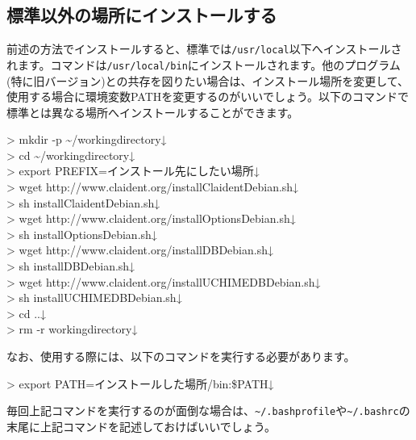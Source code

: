 \documentclass[titlepage,10pt,a4paper]{jsbook}
\newenvironment{cmd}{\begin{oframed}\raggedright\ttfamily\footnotesize\setlength{\baselineskip}{1.4em}}{\end{oframed}\vspace{-1em}}
\begin{document}
\subsection{標準以外の場所にインストールする}

前述の方法でインストールすると、標準では\texttt{/usr/local}以下へインストールされます。コマンドは\texttt{/usr/local/bin}にインストールされます。他のプログラム(特に旧バージョン)との共存を図りたい場合は、インストール場所を変更して、使用する場合に環境変数PATHを変更するのがいいでしょう。以下のコマンドで標準とは異なる場所へインストールすることができます。

\begin{cmd}
{\textgreater} mkdir -p {\textasciitilde}/workingdirectory↓\\
{\textgreater} cd {\textasciitilde}/workingdirectory↓\\
{\textgreater} export PREFIX=インストール先にしたい場所↓\\
{\textgreater} wget http://www.claident.org/installClaident{\textunderscore}Debian.sh↓\\
{\textgreater} sh installClaident{\textunderscore}Debian.sh↓\\
{\textgreater} wget http://www.claident.org/installOptions{\textunderscore}Debian.sh↓\\
{\textgreater} sh installOptions{\textunderscore}Debian.sh↓\\
{\textgreater} wget http://www.claident.org/installDB{\textunderscore}Debian.sh↓\\
{\textgreater} sh installDB{\textunderscore}Debian.sh↓\\
{\textgreater} wget http://www.claident.org/installUCHIMEDB{\textunderscore}Debian.sh↓\\
{\textgreater} sh installUCHIMEDB{\textunderscore}Debian.sh↓\\
{\textgreater} cd ..↓\\
{\textgreater} rm -r workingdirectory↓
\end{cmd}

なお、使用する際には、以下のコマンドを実行する必要があります。

\begin{cmd}
{\textgreater} export PATH=インストールした場所/bin:\$PATH↓
\end{cmd}

毎回上記コマンドを実行するのが面倒な場合は、\texttt{{\textasciitilde}/.bash{\textunderscore}profile}や\texttt{{\textasciitilde}/.bashrc}の末尾に上記コマンドを記述しておけばいいでしょう。
\end{document}
